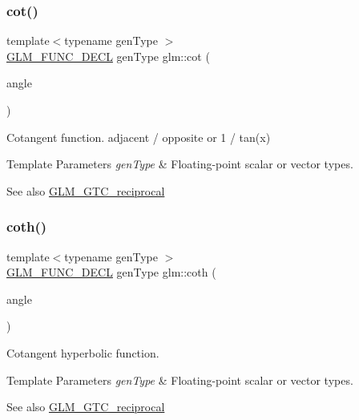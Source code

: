 \subsubsection{\texorpdfstring{cot()}{cot()}}
{\footnotesize\ttfamily template$<$typename gen\+Type $>$ \\
\hyperlink{setup_8hpp_ab2d052de21a70539923e9bcbf6e83a51}{G\+L\+M\+\_\+\+F\+U\+N\+C\+\_\+\+D\+E\+CL} gen\+Type glm\+::cot (\begin{DoxyParamCaption}\item[{gen\+Type}]{angle }\end{DoxyParamCaption})}

Cotangent function. adjacent / opposite or 1 / tan(x)


\begin{DoxyTemplParams}{Template Parameters}
{\em gen\+Type} & Floating-\/point scalar or vector types.\\
\hline
\end{DoxyTemplParams}
\begin{DoxySeeAlso}{See also}
\hyperlink{group__gtc__reciprocal}{G\+L\+M\+\_\+\+G\+T\+C\+\_\+reciprocal} 
\end{DoxySeeAlso}
\mbox{\label{group__gtc__reciprocal_ga6b8b770eb7198e4dea59d52e6db81442}} 
\subsubsection{\texorpdfstring{coth()}{coth()}}
{\footnotesize\ttfamily template$<$typename gen\+Type $>$ \\
\hyperlink{setup_8hpp_ab2d052de21a70539923e9bcbf6e83a51}{G\+L\+M\+\_\+\+F\+U\+N\+C\+\_\+\+D\+E\+CL} gen\+Type glm\+::coth (\begin{DoxyParamCaption}\item[{gen\+Type}]{angle }\end{DoxyParamCaption})}

Cotangent hyperbolic function.


\begin{DoxyTemplParams}{Template Parameters}
{\em gen\+Type} & Floating-\/point scalar or vector types.\\
\hline
\end{DoxyTemplParams}
\begin{DoxySeeAlso}{See also}
\hyperlink{group__gtc__reciprocal}{G\+L\+M\+\_\+\+G\+T\+C\+\_\+reciprocal} 
\end{DoxySeeAlso}
\mbox{\label{group__gtc__reciprocal_ga59dd0005b6474eea48af743b4f14ebbb}} 
